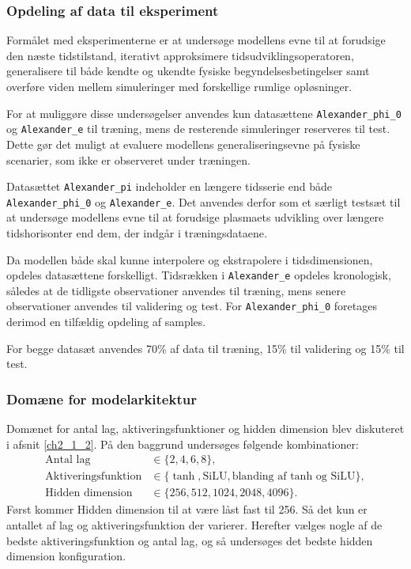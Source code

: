 
\subsubsection{Opdeling af data til eksperiment}
Formålet med eksperimenterne er at undersøge modellens evne til at forudsige den næste tidstilstand, iterativt approksimere tidsudviklingsoperatoren,
generalisere til både kendte og ukendte fysiske begyndelsesbetingelser samt overføre viden mellem simuleringer med forskellige rumlige opløsninger.

For at muliggøre disse undersøgelser anvendes kun datasættene \texttt{Alexander\_phi\_0} og \texttt{Alexander\_e} til træning, mens de resterende simuleringer reserveres til test.
Dette gør det muligt at evaluere modellens generaliseringsevne på fysiske scenarier, som ikke er observeret under træningen.

Datasættet \texttt{Alexander\_pi} indeholder en længere tidsserie end både \texttt{Alexander\_phi\_0} og \texttt{Alexander\_e}. Det anvendes derfor som et
særligt testsæt til at undersøge modellens evne til at forudsige plasmaets udvikling over længere tidshorisonter end dem, der indgår i træningsdataene.

Da modellen både skal kunne interpolere og ekstrapolere i tidsdimensionen, opdeles datasættene forskelligt. Tidsrækken i \texttt{Alexander\_e}
opdeles kronologisk, således at de tidligste observationer anvendes til træning, mens senere observationer anvendes til validering og test.
For \texttt{Alexander\_phi\_0} foretages derimod en tilfældig opdeling af samples.

For begge datasæt anvendes 70\% af data til træning, 15\% til validering og 15\% til test.

\subsubsection{Domæne for modelarkitektur}
Domænet for antal lag, aktiveringsfunktioner og hidden dimension blev diskuteret i afsnit \ref{ch2_1_2}. På den baggrund undersøges følgende kombinationer:
\begin{equation*}
\begin{aligned}
    \text{Antal lag} &\in \{2, 4, 6, 8\}, \\
    \text{Aktiveringsfunktion} &\in \{\tanh, \text{SiLU}, \text{blanding af tanh og SiLU}\}, \\
    \text{Hidden dimension} &\in \{256, 512, 1024, 2048, 4096\}.
\end{aligned}
\end{equation*}
Først kommer Hidden dimension til at være låst fast til 256. Så det kun er antallet af lag og aktiveringsfunktion der varierer.
Herefter vælges nogle af de bedste aktiveringsfunktion og antal lag, og så undersøges det bedste hidden dimension konfiguration.

